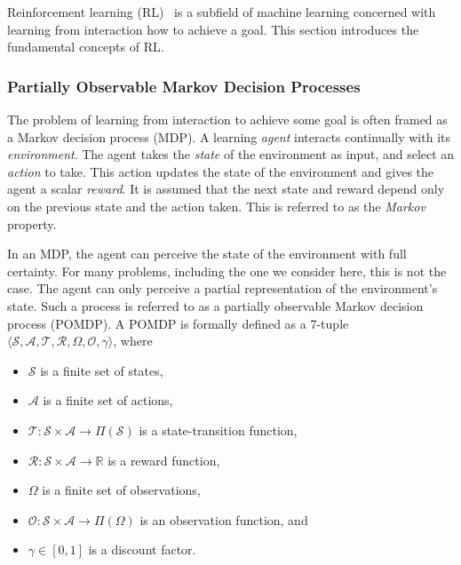 

Reinforcement learning (RL)~\cite{sutton_reinforcement_2018} is a subfield of machine learning concerned with learning from interaction how to achieve a goal.
This section introduces the fundamental concepts of RL.

\subsubsection{Partially Observable Markov Decision Processes}

The problem of learning from interaction to achieve some goal is often framed as a Markov decision process (MDP).
A learning \textit{agent} interacts continually with its \textit{environment}.
The agent takes the \textit{state} of the environment as input, and select an \textit{action} to take.
This action updates the state of the environment and gives the agent a scalar \textit{reward}.
It is assumed that the next state and reward depend only on the previous state and the action taken.
This is referred to as the \textit{Markov} property.~\cite{kaelbling_pomdp_1998}

In an MDP, the agent can perceive the state of the environment with full certainty.
For many problems, including the one we consider here, this is not the case.
The agent can only perceive a partial representation of the environment's state.
Such a process is referred to as a partially observable Markov decision process (POMDP).
A POMDP is formally defined as a 7-tuple \(\langle \mathcal{S}, \mathcal{A}, \mathcal{T}, \mathcal{R}, \Omega, \mathcal{O}, \gamma \rangle\), where

\begin{itemize}
    \item \(\mathcal{S}\) is a finite set of states,
    \item \(\mathcal{A}\) is a finite set of actions,
    \item \(\mathcal{T}: \mathcal{S} \times \mathcal{A} \rightarrow \Pi(\mathcal{S})\) is a state-transition function,
    \item \(\mathcal{R}: \mathcal{S} \times \mathcal{A} \rightarrow \mathbb{R}\) is a reward function,
    \item \(\Omega\) is a finite set of observations,
    \item \(\mathcal{O}: \mathcal{S} \times \mathcal{A} \rightarrow \Pi(\Omega)\) is an observation function, and
    \item \(\gamma \in [0, 1]\) is a discount factor.
\end{itemize}

